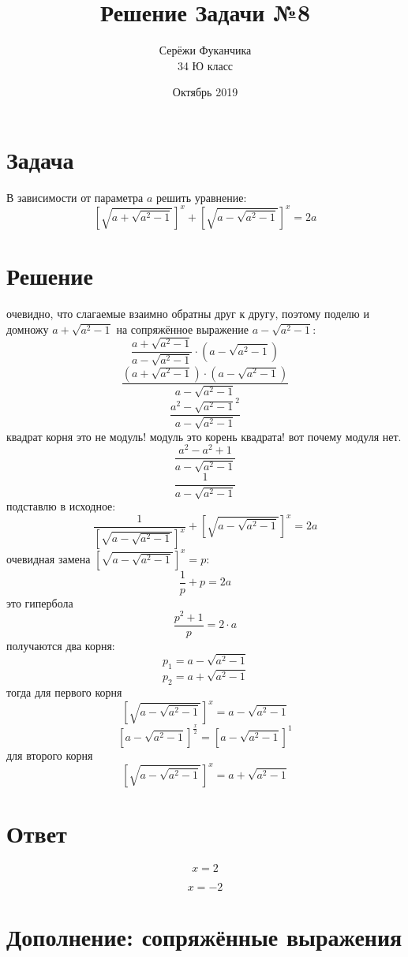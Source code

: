 \documentclass{article}
\title{Решение Задачи №8}
\author{Серёжи Фуканчика\\34 Ю класс}
\date{Октябрь 2019}
\begin{document}
\maketitle
\section{Задача}
В зависимости от параметра $a$ решить уравнение:
$$\left[\sqrt{a+\sqrt{a^2-1}}\right]^x+\left[\sqrt{a-\sqrt{a^2-1}}\right]^x=2a$$

\section{Решение}
очевидно, что слагаемые взаимно обратны друг к другу, поэтому поделю и домножу $a+\sqrt{a^2-1}$ на сопряжённое выражение $a-\sqrt{a^2-1}$:
$$\frac{a+\sqrt{a^2-1}}{a-\sqrt{a^2-1}}\cdot{(a-\sqrt{a^2-1})}$$
$$\frac{(a+\sqrt{a^2-1})\cdot{}(a-\sqrt{a^2-1})}{a-\sqrt{a^2-1}}$$
$$\frac{a^2-\sqrt{a^2-1}^2}{a-\sqrt{a^2-1}}$$
квадрат корня это не модуль! модуль это корень квадрата! вот почему модуля нет.
$$\frac{a^2-a^2+1}{a-\sqrt{a^2-1}}$$
$$\frac{1}{a-\sqrt{a^2-1}}$$
подставлю в исходное:
$$\frac{1}{\left[\sqrt{a - \sqrt{a^2-1}}\right]^x}+\left[\sqrt{a-\sqrt{a^2-1}}\right]^x=2a$$
очевидная замена $\left[\sqrt{a-\sqrt{a^2-1}}\right]^x=p$:
$$\frac{1}{p}+p=2a$$
это гипербола
$$\frac{p^2+1}{p}=2\cdot{}a$$
получаются два корня:
$$p_1=a-\sqrt{a^2-1}$$
$$p_2=a+\sqrt{a^2-1}$$
тогда для первого корня
$$\left[\sqrt{a-\sqrt{a^2-1}}\right]^x=a-\sqrt{a^2-1}$$
$$\left[a-\sqrt{a^2-1}\right]^{\frac{x}{2}}=\left[a-\sqrt{a^2-1}\right]^1$$
для второго корня
$$\left[\sqrt{a-\sqrt{a^2-1}}\right]^x=a+\sqrt{a^2-1}$$

\section{Ответ}
\[
x=2
\]

\[
x=-2
\]

\section{Дополнение: сопряжённые выражения}
\end{document}
